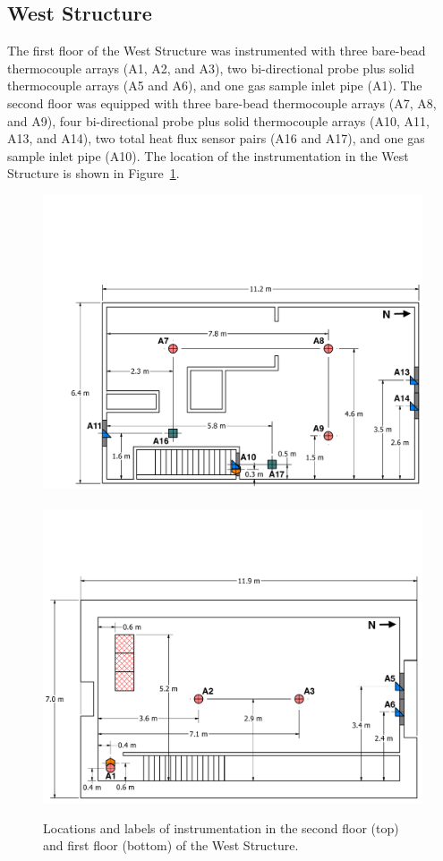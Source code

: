 \subsection{West Structure}
The first floor of the West Structure was instrumented with three bare-bead thermocouple arrays (A1, A2, and A3), two bi-directional probe plus solid thermocouple arrays (A5 and A6), and one gas sample inlet pipe (A1). The second floor was equipped with three bare-bead thermocouple arrays (A7, A8, and A9), four bi-directional probe plus solid thermocouple arrays (A10, A11, A13, and A14), two total heat flux sensor pairs (A16 and A17), and one gas sample inlet pipe (A10). The location of the instrumentation in the West Structure is shown in Figure~\ref{fig:west_instrumentation}.

\begin{figure}[!ht]
	\centering
	\includegraphics[width=0.94\columnwidth]{Figures/Floor_Plans/West_Structure_2nd_Floor_Dimensioned_Instrumentation}
	\\~\\
	\includegraphics[width=\columnwidth]{Figures/Floor_Plans/West_Structure_1st_Floor_Dimensioned_Instrumentation}
	\caption[Locations and labels of instrumentation in the West Structure.]{Locations and labels of instrumentation in the second floor (top) and first floor (bottom) of the West Structure.}
	\label{fig:west_instrumentation}
\end{figure}

